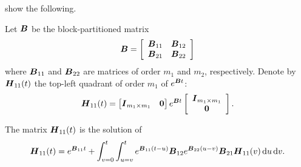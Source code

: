 \cite{ln2015} show the following.
\begin{lem}\label{lem: sfkjgn}
	Let \(\boldsymbol B\) be the block-partitioned matrix
	\[\boldsymbol B = \left[\begin{array}{cc} \boldsymbol B_{11} & \boldsymbol B_{12} \\ \boldsymbol B_{21} & \boldsymbol B_{22} \end{array}\right]\]
	where \(\boldsymbol B_{11}\) and \(\boldsymbol B_{22}\) are matrices of order \(m_1\) and \(m_2\), respectively. Denote by \(\boldsymbol H_{11}(t)\) the top-left quadrant of order \(m_1\) of \(e^{\boldsymbol Bt}\):
	\[\boldsymbol H_{11}(t) = \begin{bmatrix} \boldsymbol I_{m_1\times m_1} & \boldsymbol 0 \end{bmatrix} e^{\boldsymbol Bt}\left[\begin{array}{c}\boldsymbol I_{m_1\times m_1} \\ \boldsymbol 0\end{array}\right].\]
	
	The matrix \(\boldsymbol H_{11}(t)\) is the solution of 
	\begin{align}\label{eqn: akg987LKJ}
		\boldsymbol H_{11}(t) = e^{\boldsymbol B_{11}t} + \int_{v=0}^t\int_{u=v}^t e^{\boldsymbol B_{11}(t-u)}\boldsymbol B_{12}e^{\boldsymbol B_{22}(u-v)}\boldsymbol B_{21}\boldsymbol H_{11}(v)\, \mathrm{d} u\, \mathrm{d} v.
	\end{align}
\end{lem}

